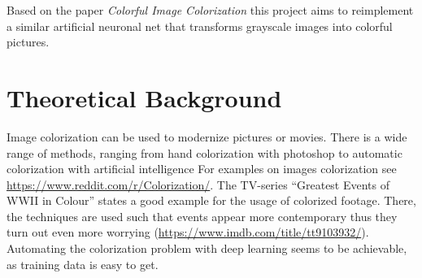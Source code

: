 \documentclass[12pt,letterpaper]{article}
\begin{document}
Based on the paper \emph{Colorful Image Colorization} \citep{Zhang.2016} this project aims to reimplement a similar artificial neuronal net that transforms grayscale images into colorful pictures.\\

\section{Theoretical Background}
Image colorization can be used to modernize pictures or movies. There is a wide range of methods, ranging from hand colorization with photoshop to automatic colorization with artificial intelligence For examples on images colorization see \url{https://www.reddit.com/r/Colorization/}. The TV-series \enquote{Greatest Events of WWII in Colour} states a good example for the usage of colorized footage. There, the techniques are used such that events appear more contemporary thus they turn out even more worrying (\url{https://www.imdb.com/title/tt9103932/}). 
Automating the colorization problem with deep learning seems to be achievable, as training data is easy to get.
\end{document}

